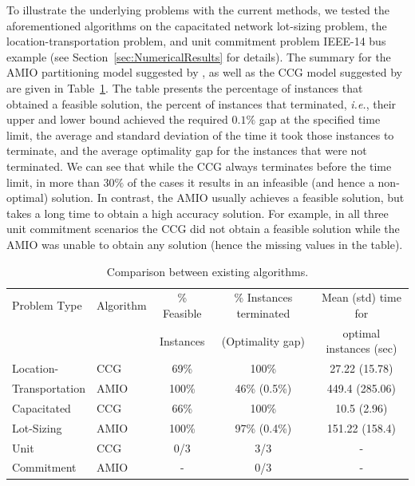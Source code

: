 \documentclass[12pt,x11names]{article}
\theoremstyle{definition}
\newcommand{\ie}{{\em i.e.}, }
\begin{document}
To illustrate the underlying problems with the current methods, we tested the aforementioned algorithms on the capacitated network lot-sizing problem, the location-transportation problem, and unit commitment problem IEEE-14 bus example (see Section~\ref{sec:NumericalResults} for details). The summary for the AMIO partitioning model suggested by \citet{BertsimasDunning2014}, as well as the CCG model suggested by \citet{Zeng2013} are given in Table~\ref{Tbl:CompareMethods}. The table presents the percentage of instances that obtained a feasible solution, the percent of instances that terminated, \ie their upper and lower bound achieved the required $0.1\%$ gap at the specified time limit, the average and standard deviation of the time it took those instances to terminate, and the average optimality gap for the instances that were not terminated.  We can see that while the CCG always terminates before the time limit, in more than $30\%$ of the cases it results in an infeasible (and hence a non-optimal) solution. In contrast, the AMIO usually achieves a feasible solution, but takes a long time to obtain a high accuracy solution. For example, in all three unit commitment scenarios the CCG did not obtain a feasible solution while the AMIO was unable to obtain any solution (hence the missing values in the table).


\renewcommand{\arraystretch}{0.7}
\begin{table}[h]
\caption{Comparison between existing algorithms.}\label{Tbl:CompareMethods}
\begin{center}
\begin{tabular}{|l|l|c|c|c|}
\hline
Problem Type & Algorithm & \% Feasible&  \% Instances  terminated& Mean (std) time  for\\
&& Instances &(Optimality gap) & optimal  instances (sec)\\
\hline
{Location-}  & CCG & 69\% & 100\% & 27.22 (15.78)\\
Transportation& AMIO & 100\% & 46\% (0.5\%) & 449.4 (285.06)\\
\hline
{Capacitated}  & CCG & 66\% & 100\% &  10.5 (2.96)\\
 Lot-Sizing & AMIO & 100\% & 97\% (0.4\%) & 151.22 (158.4)\\
\hline
Unit   & CCG & 0/3 & 3/3 & -\\
Commitment& AMIO & - & 0/3 & -\\
\hline
\end{tabular}
\end{center}
\end{table}
\end{document}
